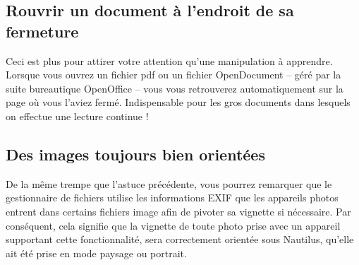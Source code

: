 \subsection{Rouvrir un document à l'endroit de sa fermeture}
Ceci est plus pour attirer votre attention qu'une manipulation à apprendre. Lorsque vous ouvrez un fichier pdf ou un fichier OpenDocument -- géré par la suite bureautique OpenOffice -- vous vous retrouverez automatiquement sur la page où vous l'aviez fermé. Indispensable pour les gros documents dans lesquels on effectue une lecture continue !
\subsection{Des images toujours bien orientées}
De la même trempe que l'astuce précédente, vous pourrez remarquer que le gestionnaire de fichiers utilise les informations EXIF que les appareils photos entrent dans certains fichiers image afin de pivoter sa vignette si nécessaire. Par conséquent, cela signifie que la vignette de toute photo prise avec un appareil supportant cette fonctionnalité, sera correctement orientée sous Nautilus, qu'elle ait été prise en mode paysage ou portrait.
